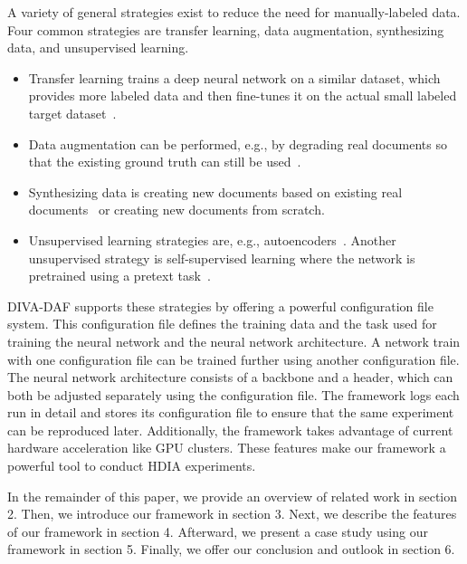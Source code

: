 \documentclass[runningheads]{llncs}
\begin{document}
A variety of general strategies exist to reduce the need for manually-labeled data. Four common strategies are transfer learning, data augmentation, synthesizing data, and unsupervised learning.
\begin{itemize}
    \item Transfer learning trains a deep neural network on a similar dataset, which provides more labeled data and then fine-tunes it on the actual small labeled target dataset~\cite{caruanaMultitaskLearning1997}.
    \item Data augmentation can be performed, e.g., by degrading real documents so that the existing ground truth can still be used~\cite{bairdDocumentImageDefect1992,kieuCharacterDegradationModel2012,seuretGradientdomainDegradationsImproving2015}.
    \item Synthesizing data is creating new documents based on existing real documents~\cite{capobiancoDocEmulToolkitGenerate2017,journetDocCreatorNewSoftware2017,vogtlinGeneratingSyntheticHandwritten2021a} or creating new documents from scratch.
    \item Unsupervised learning strategies are, e.g., autoencoders~\cite{masciStackedConvolutionalAutoEncoders2011,albertiPitfallUnsupervisedPreTraining2017a}. Another unsupervised strategy is self-supervised learning where the network is pretrained using a pretext task~\cite{cosmaSelfsupervisedRepresentationLearning2020}.
\end{itemize}

DIVA-DAF supports these strategies by offering a powerful configuration file system. This configuration file defines the training data and the task used for training the neural network and the neural network architecture. A network train with one configuration file can be trained further using another configuration file. The neural network architecture consists of a backbone and a header, which can both be adjusted separately using the configuration file. The framework logs each run in detail and stores its configuration file to ensure that the same experiment can be reproduced later. Additionally, the framework takes advantage of current hardware acceleration like GPU clusters. These features make our framework a powerful tool to conduct \ac{HDIA} experiments.

In the remainder of this paper, we provide an overview of related work in section 2. Then, we introduce our framework in section 3. Next, we describe the features of our framework in section 4. Afterward, we present a case study using our framework in section 5. Finally, we offer our conclusion and outlook in section 6.
\end{document}
